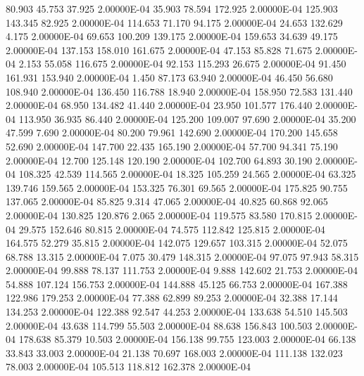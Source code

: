     80.903    45.753    37.925  2.00000E-04
    35.903    78.594   172.925  2.00000E-04
   125.903   143.345    82.925  2.00000E-04
   114.653    71.170    94.175  2.00000E-04
    24.653   132.629     4.175  2.00000E-04
    69.653   100.209   139.175  2.00000E-04
   159.653    34.639    49.175  2.00000E-04
   137.153   158.010   161.675  2.00000E-04
    47.153    85.828    71.675  2.00000E-04
     2.153    55.058   116.675  2.00000E-04
    92.153   115.293    26.675  2.00000E-04
    91.450   161.931   153.940  2.00000E-04
     1.450    87.173    63.940  2.00000E-04
    46.450    56.680   108.940  2.00000E-04
   136.450   116.788    18.940  2.00000E-04
   158.950    72.583   131.440  2.00000E-04
    68.950   134.482    41.440  2.00000E-04
    23.950   101.577   176.440  2.00000E-04
   113.950    36.935    86.440  2.00000E-04
   125.200   109.007    97.690  2.00000E-04
    35.200    47.599     7.690  2.00000E-04
    80.200    79.961   142.690  2.00000E-04
   170.200   145.658    52.690  2.00000E-04
   147.700    22.435   165.190  2.00000E-04
    57.700    94.341    75.190  2.00000E-04
    12.700   125.148   120.190  2.00000E-04
   102.700    64.893    30.190  2.00000E-04
   108.325    42.539   114.565  2.00000E-04
    18.325   105.259    24.565  2.00000E-04
    63.325   139.746   159.565  2.00000E-04
   153.325    76.301    69.565  2.00000E-04
   175.825    90.755   137.065  2.00000E-04
    85.825     9.314    47.065  2.00000E-04
    40.825    60.868    92.065  2.00000E-04
   130.825   120.876     2.065  2.00000E-04
   119.575    83.580   170.815  2.00000E-04
    29.575   152.646    80.815  2.00000E-04
    74.575   112.842   125.815  2.00000E-04
   164.575    52.279    35.815  2.00000E-04
   142.075   129.657   103.315  2.00000E-04
    52.075    68.788    13.315  2.00000E-04
     7.075    30.479   148.315  2.00000E-04
    97.075    97.943    58.315  2.00000E-04
    99.888    78.137   111.753  2.00000E-04
     9.888   142.602    21.753  2.00000E-04
    54.888   107.124   156.753  2.00000E-04
   144.888    45.125    66.753  2.00000E-04
   167.388   122.986   179.253  2.00000E-04
    77.388    62.899    89.253  2.00000E-04
    32.388    17.144   134.253  2.00000E-04
   122.388    92.547    44.253  2.00000E-04
   133.638    54.510   145.503  2.00000E-04
    43.638   114.799    55.503  2.00000E-04
    88.638   156.843   100.503  2.00000E-04
   178.638    85.379    10.503  2.00000E-04
   156.138    99.755   123.003  2.00000E-04
    66.138    33.843    33.003  2.00000E-04
    21.138    70.697   168.003  2.00000E-04
   111.138   132.023    78.003  2.00000E-04
   105.513   118.812   162.378  2.00000E-04
